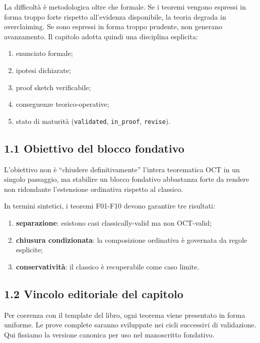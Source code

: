 La difficoltà è metodologica oltre che formale. Se i teoremi vengono espressi in forma troppo forte rispetto all'evidenza disponibile, la teoria degrada in overclaiming. Se sono espressi in forma troppo prudente, non generano avanzamento. Il capitolo adotta quindi una disciplina esplicita:

\begin{enumerate}
\def\labelenumi{\arabic{enumi}.}
\tightlist
\item
  enunciato formale;
\item
  ipotesi dichiarate;
\item
  proof sketch verificabile;
\item
  conseguenze teorico-operative;
\item
  stato di maturità (\texttt{validated}, \texttt{in\_proof}, \texttt{revise}).
\end{enumerate}

\subsection{1.1 Obiettivo del blocco fondativo}

L'obiettivo non è ``chiudere definitivamente'' l'intera teorematica OCT in un singolo passaggio, ma stabilire un blocco fondativo abbastanza forte da rendere non ridondante l'estensione ordinativa rispetto al classico.

In termini sintetici, i teoremi F01-F10 devono garantire tre risultati:

\begin{enumerate}
\def\labelenumi{\arabic{enumi}.}
\tightlist
\item
  \textbf{separazione}: esistono casi classically-valid ma non OCT-valid;
\item
  \textbf{chiusura condizionata}: la composizione ordinativa è governata da regole esplicite;
\item
  \textbf{conservatività}: il classico è recuperabile come caso limite.
\end{enumerate}

\subsection{1.2 Vincolo editoriale del capitolo}

Per coerenza con il template del libro, ogni teorema viene presentato in forma uniforme. Le prove complete saranno sviluppate nei cicli successivi di validazione. Qui fissiamo la versione canonica per uso nel manoscritto fondativo.

